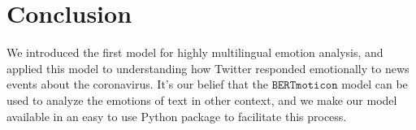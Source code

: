 \documentclass[11pt]{article}
\newcommand{\bertmoji}{\texttt{BERTmoticon}}
\DeclareMathOperator{\emoticon}{\texttt{TwitterEmoticon}}
\DeclareMathOperator{\corona}{\texttt{TwitterCorona}}
\begin{document}

\section{Conclusion}

We introduced the first model for highly multilingual emotion analysis,
and applied this model to understanding how Twitter responded emotionally to news events about the coronavirus.
It's our belief that the $\bertmoji$ model can be used to analyze the emotions of text in other context,
and we make our model available in an easy to use Python package to facilitate this process.



%


\end{document}
